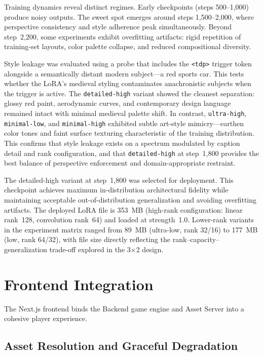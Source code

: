 \documentclass[conference]{IEEEtran}
\begin{document}
Training dynamics reveal distinct regimes. Early checkpoints (steps
500--1,000) produce noisy outputs. The sweet spot emerges around steps
1,500--2,000, where perspective consistency and style adherence peak
simultaneously. Beyond step~2,200, some experiments exhibit overfitting
artifacts: rigid repetition of training-set layouts, color palette
collapse, and reduced compositional diversity.

Style leakage was evaluated using a probe that includes the \texttt{<tdp>}
trigger token alongside a semantically distant modern subject---a red
sports car. This tests whether the LoRA's medieval styling contaminates
anachronistic subjects when the trigger is active. The
\texttt{detailed-high} variant showed the cleanest separation: glossy red
paint, aerodynamic curves, and contemporary design language remained
intact with minimal medieval palette shift. In contrast,
\texttt{ultra-high}, \texttt{minimal-low}, and \texttt{minimal-high}
exhibited subtle art-style mimicry---earthen color tones and faint surface
texturing characteristic of the training distribution. This confirms that
style leakage exists on a spectrum modulated by caption detail and rank
configuration, and that \texttt{detailed-high} at step~1,800 provides the
best balance of perspective enforcement and domain-appropriate restraint.

The detailed-high variant at step~1,800 was selected for deployment. This
checkpoint achieves maximum in-distribution architectural fidelity while
maintaining acceptable out-of-distribution generalization and avoiding
overfitting artifacts. The deployed LoRA file is 353~MB (high-rank configuration: linear rank~128,
convolution rank~64) and loaded at strength~1.0. Lower-rank variants in the
experiment matrix ranged from 89~MB (ultra-low, rank 32/16) to 177~MB
(low, rank 64/32), with file size directly reflecting the
rank--capacity--generalization trade-off explored in the 3$\times$2 design.

\FloatBarrier
\section{Frontend Integration}
\label{sec:frontend}

The Next.js frontend binds the Backend game engine and Asset Server into
a cohesive player experience.

\subsection{Asset Resolution and Graceful Degradation}
\end{document}
